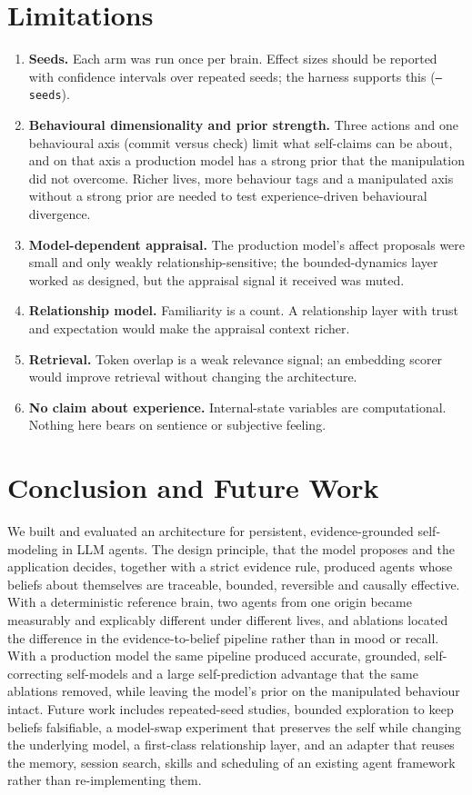 \documentclass[11pt]{article}
\begin{document}
\section{Limitations}
\begin{enumerate}
\item \textbf{Seeds.} Each arm was run once per brain. Effect sizes should be reported with confidence intervals over repeated seeds; the harness supports this (\texttt{--seeds}).
\item \textbf{Behavioural dimensionality and prior strength.} Three actions and one behavioural axis (commit versus check) limit what self-claims can be about, and on that axis a production model has a strong prior that the manipulation did not overcome. Richer lives, more behaviour tags and a manipulated axis without a strong prior are needed to test experience-driven behavioural divergence.
\item \textbf{Model-dependent appraisal.} The production model's affect proposals were small and only weakly relationship-sensitive; the bounded-dynamics layer worked as designed, but the appraisal signal it received was muted.
\item \textbf{Relationship model.} Familiarity is a count. A relationship layer with trust and expectation would make the appraisal context richer.
\item \textbf{Retrieval.} Token overlap is a weak relevance signal; an embedding scorer would improve retrieval without changing the architecture.
\item \textbf{No claim about experience.} Internal-state variables are computational. Nothing here bears on sentience or subjective feeling.
\end{enumerate}

\section{Conclusion and Future Work}
We built and evaluated an architecture for persistent, evidence-grounded self-modeling in LLM agents. The design principle, that the model proposes and the application decides, together with a strict evidence rule, produced agents whose beliefs about themselves are traceable, bounded, reversible and causally effective. With a deterministic reference brain, two agents from one origin became measurably and explicably different under different lives, and ablations located the difference in the evidence-to-belief pipeline rather than in mood or recall. With a production model the same pipeline produced accurate, grounded, self-correcting self-models and a large self-prediction advantage that the same ablations removed, while leaving the model's prior on the manipulated behaviour intact. Future work includes repeated-seed studies, bounded exploration to keep beliefs falsifiable, a model-swap experiment that preserves the self while changing the underlying model, a first-class relationship layer, and an adapter that reuses the memory, session search, skills and scheduling of an existing agent framework~\cite{hermes2026} rather than re-implementing them.
\end{document}
